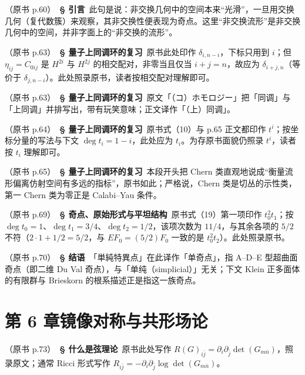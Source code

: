 \noindent （原书 p.60）\ \textbf{§ 引言}\ 此句是说：非交换几何中的空间本来“光滑”，一旦用交换几何（复代数簇）来观察，其非交换性便表现为奇点。这里“非交换流形”是非交换几何中的空间，并非字面上的“非交换的流形”。\par\smallskip

\noindent （原书 p.63）\ \textbf{§ 量子上同调环的复习}\ 原书此处印作 $\delta_{i,n-i}$，下标只用到 $i$；但 $\eta_{ij}=C_{0ij}$ 是 $H^{2i}$ 与 $H^{2j}$ 的相交配对，非零当且仅当 $i+j=n$，故应为 $\delta_{i+j,n}$（等价于 $\delta_{j,n-i}$）。此处照录原书，读者按相交配对理解即可。\par\smallskip

\noindent （原书 p.63）\ \textbf{§ 量子上同调环的复习}\ 原文「（コ）ホモロジー」把「同调」与「上同调」并排写出，带有玩笑意味；正文译作「（上）同调」。\par\smallskip

\noindent （原书 p.64）\ \textbf{§ 量子上同调环的复习}\ 原书式（10）与 p.65 正文都印作 $t^i$；按坐标分量的写法与下文 $\deg t_i=1-i$，此处应为 $t_i$。为存原书面貌仍照录 $t^i$，读者按 $t_i$ 理解即可。\par\smallskip

\noindent （原书 p.65）\ \textbf{§ 量子上同调环的复习}\ 本段开头把 Chern 类直观地说成“衡量流形偏离仿射空间有多远的指标”，原书如此；严格说，Chern 类是切丛的示性类，第一 Chern 类为零正是 Calabi--Yau 条件。\par\smallskip

\noindent （原书 p.69）\ \textbf{§ 奇点、原始形式与平坦结构}\ 原书式（19）第一项印作 $t_0^2t_1$；按 $\deg t_0=1$、$\deg t_1=3/4$、$\deg t_2=1/2$，该项次数为 $11/4$，与其余各项的 $5/2$ 不符（$2\cdot1+1/2=5/2$，与 $EF_0=(5/2)F_0$ 一致的是 $t_0^2t_2$）。此处照录原书。\par\smallskip

\noindent （原书 p.70）\ \textbf{§ 结语}\ 「単純特異点」在此译作「单奇点」，指 A--D--E 型超曲面奇点（即二维 Du Val 奇点），与「单纯（simplicial）」无关；下文 Klein 正多面体的有限群与 Brieskorn 的根系描述正是指这一族奇点。\par\smallskip

\section*{第 6 章\quad 镜像对称与共形场论}

\noindent （原书 p.73）\ \textbf{§ 什么是弦理论}\ 原书此处写作 $R(G)_{i\bar j}=\partial_i\partial_{\bar j}\det(G_{m\bar n})$，照录原文；通常 Ricci 形式写作 $R_{i\bar j}=-\partial_i\partial_{\bar j}\log\det(G_{m\bar n})$。\par\smallskip

